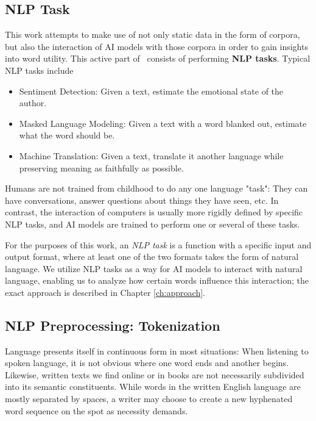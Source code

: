\subsection{NLP Task}
This work attempts to make use of not only static data in the form of corpora, but also the interaction of AI models with those corpora in order to gain insights into word utility.
This active part of \NLP\ consists of performing \textbf{NLP tasks}.
Typical NLP tasks include \cite{jurafskySpeechLanguageProcessing2025}

\begin{itemize}
	\item Sentiment Detection: Given a text, estimate the emotional state of the author.
	\item Masked Language Modeling: Given a text with a word blanked out, estimate what the word should be.
	\item Machine Translation: Given a text, translate it another language while preserving meaning as faithfully as possible.
\end{itemize}

Humans are not trained from childhood to do any one language "task":
They can have conversations, answer questions about things they have seen, etc.
In contrast, the interaction of computers is usually more rigidly defined by specific NLP tasks, and AI models are trained to perform one or several of these tasks.

For the purposes of this work, an \textit{NLP task} is a function with a specific input and output format, where at least one of the two formats takes the form of natural language.
We utilize NLP tasks as a way for AI models to interact with natural language, enabling us to analyze how certain words influence this interaction; the exact approach is described in Chapter \ref{ch:approach}.


\subsection{NLP Preprocessing: Tokenization} \label{sec:tokenization}
Language presents itself in continuous form in most situations:
When listening to spoken language, it is not obvious where one word ends and another begins.
Likewise, written texts we find online or in books are not necessarily subdivided into its semantic constituents.
While words in the written English language are mostly separated by spaces, a writer may choose to create a new hyphenated word sequence on the spot as necessity demands.

